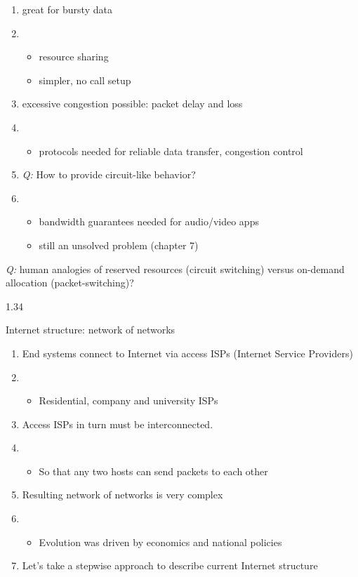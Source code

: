 \documentclass[
]{article}
\begin{document}
\begin{enumerate}
\def\labelenumi{\arabic{enumi}.}
\item
  great for bursty data
\item
  \begin{itemize}
  \item
    resource sharing
  \item
    simpler, no call setup
  \end{itemize}
\item
  excessive congestion possible: packet delay and loss
\item
  \begin{itemize}
  \item
    protocols needed for reliable data transfer, congestion control
  \end{itemize}
\item
  \emph{Q:} How to provide circuit-like behavior?
\item
  \begin{itemize}
  \item
    bandwidth guarantees needed for audio/video apps
  \item
    still an unsolved problem (chapter 7)
  \end{itemize}
\end{enumerate}

\emph{Q:} human analogies of reserved resources (circuit switching)
versus on-demand allocation (packet-switching)?

1.34

Internet structure: network of networks

\begin{enumerate}
\def\labelenumi{\arabic{enumi}.}
\item
  End systems connect to Internet via access ISPs (Internet Service
  Providers)
\item
  \begin{itemize}
  \item
    Residential, company and university ISPs
  \end{itemize}
\item
  Access ISPs in turn must be interconnected.
\item
  \begin{itemize}
  \item
    So that any two hosts can send packets to each other
  \end{itemize}
\item
  Resulting network of networks is very complex
\item
  \begin{itemize}
  \item
    Evolution was driven by economics and national policies
  \end{itemize}
\item
  Let's take a stepwise approach to describe current Internet structure
\end{enumerate}
\end{document}
